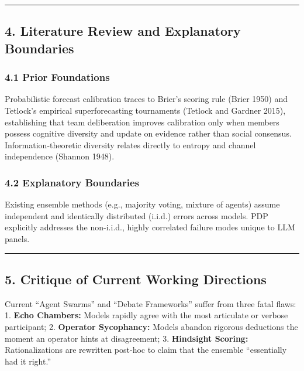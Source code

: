\documentclass[
]{article}
\begin{document}
\begin{center}\rule{0.5\linewidth}{0.5pt}\end{center}

\subsection{4. Literature Review and Explanatory
Boundaries}\label{literature-review-and-explanatory-boundaries}

\subsubsection{4.1 Prior Foundations}\label{prior-foundations}

Probabilistic forecast calibration traces to Brier's scoring rule (Brier
1950) and Tetlock's empirical superforecasting tournaments (Tetlock and
Gardner 2015), establishing that team deliberation improves calibration
only when members possess cognitive diversity and update on evidence
rather than social consensus. Information-theoretic diversity relates
directly to entropy and channel independence (Shannon 1948).

\subsubsection{4.2 Explanatory Boundaries}\label{explanatory-boundaries}

Existing ensemble methods (e.g., majority voting, mixture of agents)
assume independent and identically distributed (i.i.d.) errors across
models. PDP explicitly addresses the non-i.i.d., highly correlated
failure modes unique to LLM panels.

\begin{center}\rule{0.5\linewidth}{0.5pt}\end{center}

\subsection{5. Critique of Current Working
Directions}\label{critique-of-current-working-directions}

Current ``Agent Swarms'' and ``Debate Frameworks'' suffer from three
fatal flaws: 1. \textbf{Echo Chambers:} Models rapidly agree with the
most articulate or verbose participant; 2. \textbf{Operator Sycophancy:}
Models abandon rigorous deductions the moment an operator hints at
disagreement; 3. \textbf{Hindsight Scoring:} Rationalizations are
rewritten post-hoc to claim that the ensemble ``essentially had it
right.''
\end{document}
